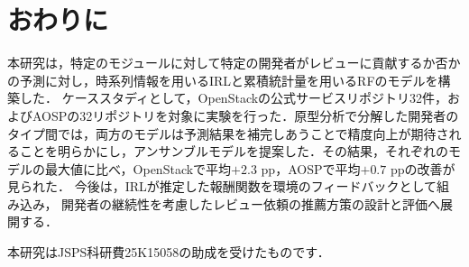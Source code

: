 \documentclass[submit,noauthor,ses,dvipdfmx]{ipsj}
\begin{document}
\section{おわりに}\label{sec:conclusion}
本研究は，特定のモジュールに対して特定の開発者がレビューに貢献するか否かの予測に対し，時系列情報を用いるIRLと累積統計量を用いるRFのモデルを構築した．
ケーススタディとして，OpenStackの公式サービスリポジトリ32件，およびAOSPの32リポジトリを対象に実験を行った．原型分析で分解した開発者のタイプ間では，両方のモデルは予測結果を補完しあうことで精度向上が期待されることを明らかにし，アンサンブルモデルを提案した．その結果，それぞれのモデルの最大値に比べ，OpenStackで平均$+2.3$ pp，AOSPで平均$+0.7$ ppの改善が見られた．
今後は，IRLが推定した報酬関数を環境のフィードバックとして組み込み，
開発者の継続性を考慮したレビュー依頼の推薦方策の設計と評価へ展開する．



\vspace{1mm}
\begin{acknowledgment}
本研究はJSPS科研費25K15058の助成を受けたものです．
\end{acknowledgment}
\vspace{-2mm}


\end{document}
